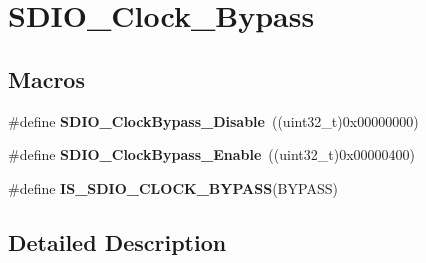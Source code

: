 \hypertarget{group___s_d_i_o___clock___bypass}{\section{S\-D\-I\-O\-\_\-\-Clock\-\_\-\-Bypass}
\label{group___s_d_i_o___clock___bypass}
}
\subsection*{Macros}
\begin{DoxyCompactItemize}
\item 
\hypertarget{group___s_d_i_o___clock___bypass_gacc168d55136a0c6575e5afd7a6550343}{\#define {\bfseries S\-D\-I\-O\-\_\-\-Clock\-Bypass\-\_\-\-Disable}~((uint32\-\_\-t)0x00000000)}\label{group___s_d_i_o___clock___bypass_gacc168d55136a0c6575e5afd7a6550343}

\item 
\hypertarget{group___s_d_i_o___clock___bypass_ga5e1e9f7e05ea62dd2315eb556bc10e5c}{\#define {\bfseries S\-D\-I\-O\-\_\-\-Clock\-Bypass\-\_\-\-Enable}~((uint32\-\_\-t)0x00000400)}\label{group___s_d_i_o___clock___bypass_ga5e1e9f7e05ea62dd2315eb556bc10e5c}

\item 
\#define {\bfseries I\-S\-\_\-\-S\-D\-I\-O\-\_\-\-C\-L\-O\-C\-K\-\_\-\-B\-Y\-P\-A\-S\-S}(B\-Y\-P\-A\-S\-S)
\end{DoxyCompactItemize}


\subsection{Detailed Description}


